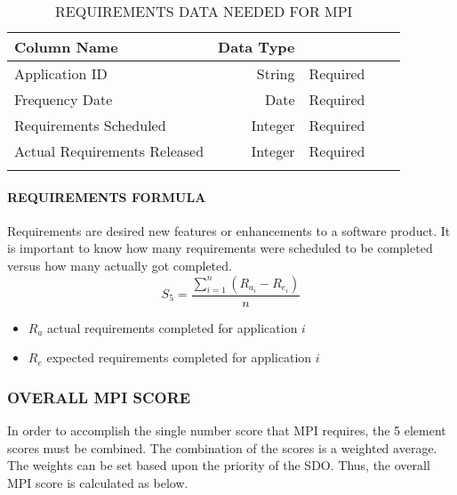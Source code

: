 \documentclass[SDSUThesis.tex]{subfiles}
\begin{document}
                \begin{longtable}{@{}l rr rr}
                    \toprule%
                     \centering%
                     {\bfseries Column Name}
                     & {\bfseries Data Type}
                     &  \\
                    
                    \cmidrule[0.4pt](r{0.125em}){1-1}%
                    \cmidrule[0.4pt](lr{0.125em}){2-2}%
                    \cmidrule[0.4pt](l{0.125em}){3-3}%
                    \endhead
                    
                    Application ID & String  & Required \\
                    \myrowcolour%
                    Frequency Date & Date & Required \\
                    Requirements Scheduled & Integer & Required \\
                    \myrowcolour%
                    Actual Requirements Released & Integer  & Required \\
                    
                    \bottomrule
                    
                    \caption{REQUIREMENTS DATA NEEDED FOR MPI}
                    \label{tab:req}
                \end{longtable}
            
            \paragraph{REQUIREMENTS FORMULA}
                Requirements are desired new features or enhancements 
                to a software product.  It is important to know how many requirements
                were scheduled to be completed versus how many actually got completed.  
                \[
                    S_5 = \frac{\sum^n_{i=1}\left( R_{a_i} - R_{e_i} \right)}{n}
                \]
                \begin{itemize}
                    \item $R_a$ actual requirements completed for application $i$
                    \item $R_e$ expected requirements completed for application $i$
                \end{itemize}
            

        \subsubsection{OVERALL MPI SCORE}
            In order to accomplish the single number score that MPI requires,
            the 5 element scores must be combined. The combination of the scores
            is a weighted average.  The weights can be set based upon the 
            priority of the SDO.  Thus, the overall MPI score is calculated as below.
            
\end{document}
